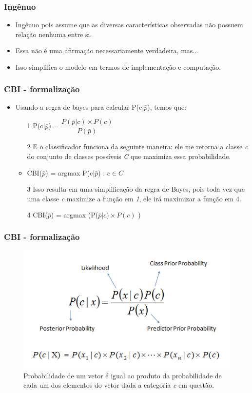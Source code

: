 \documentclass[xcolor=table]{beamer}
\begin{document}
	\begin{frame}
		\frametitle{Ingênuo}
			\begin{itemize}
				\item Ingênuo pois assume que as diversas características observadas não possuem relação nenhuma entre si.\\
				\item Essa não é uma afirmação necessariamente verdadeira, mas...\\
				\item  Isso simplifica o modelo em termos de implementação e computação.\\
		\end{itemize}
	\end{frame}
	\begin{frame}
		\frametitle{CBI - formalização}
		\begin{itemize}
			\item Usando a regra de bayes para calcular P(c|$\bar{p}$), temos que:\\
			\begin{itemize}
				\item[1] P(c|$\bar{p}$) = $\dfrac{P(\bar{p}|c)\times P(c)}{P(\bar{p})}$
				\item[2] E o classificador funciona da seguinte maneira: ele me retorna a classe \textit{c} do conjunto de classes possíveis \textit{C} que maximiza essa probabilidade.\\
				\item CBI($\bar{p}$) = argmax P(c|$\bar{p}$) : ${c\in C}$\\
				\item[3] Isso resulta em uma simplificação da regra de Bayes, pois toda vez que uma classe \textit{c} maximize a função em \textit{1}, ele irá maximizar a função em 4.\\
				\item[4] CBI($\bar{p}$) = argmax (P($\bar{p}|c) \times P(c)$ )
			\end{itemize}
		\end{itemize}
	\end{frame}
	\begin{frame}
		\frametitle{CBI - formalização}
		
		\begin{figure}
\centering
\includegraphics[width=0.7\linewidth]{bayes}
\caption{Probabilidade de um vetor é igual ao produto da probabilidade de cada um dos elementos do vetor dada a categoria \textit{c} em questão.}
\label{fig:bayes}
\end{figure}

	\end{frame}
\end{document}
